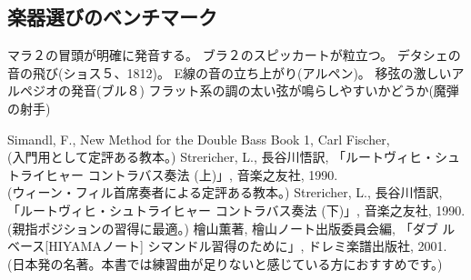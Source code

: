 \documentclass{jarticle}
\begin{document}
\subsection{楽器選びのベンチマーク}
マラ２の冒頭が明確に発音する。
ブラ２のスピッカートが粒立つ。
デタシェの音の飛び(ショス５、1812)。
E線の音の立ち上がり(アルペン)。
移弦の激しいアルペジオの発音(ブル８)
フラット系の調の太い弦が鳴らしやすいかどうか(魔弾の射手)
\begin{thebibliography}{99}
 Simandl, F., New Method for the Double Bass Book 1, Carl Fischer, \\
(入門用として定評ある教本。)
 Strericher, L., 長谷川悟訳, 「ルートヴィヒ・シュトライヒャー コントラバス奏法 (上)」, 音楽之友社, 1990. \\
(ウィーン・フィル首席奏者による定評ある教本。)
 Strericher, L., 長谷川悟訳, 「ルートヴィヒ・シュトライヒャー コントラバス奏法 (下)」, 音楽之友社, 1990. \\
(親指ポジションの習得に最適。)
 檜山薫著, 檜山ノート出版委員会編, 「ダブ
ルベース[HIYAMAノート] シマンドル習得のために」, ドレミ楽譜出版社,
2001.\\ 
(日本発の名著。本書では練習曲が足りないと感じている方におすすめです。)
\end{thebibliography}

\endmuflex
\end{document}
